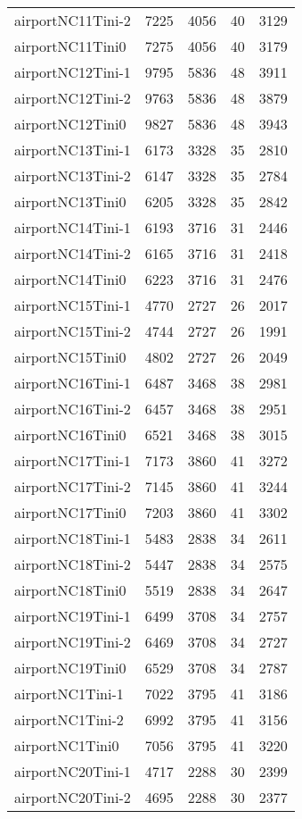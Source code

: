 \begin{longtable}{lrrrr}
airportNC11Tini-2 & 7225 & 4056 & 40 & 3129 \\
airportNC11Tini0 & 7275 & 4056 & 40 & 3179 \\
airportNC12Tini-1 & 9795 & 5836 & 48 & 3911 \\
airportNC12Tini-2 & 9763 & 5836 & 48 & 3879 \\
airportNC12Tini0 & 9827 & 5836 & 48 & 3943 \\
airportNC13Tini-1 & 6173 & 3328 & 35 & 2810 \\
airportNC13Tini-2 & 6147 & 3328 & 35 & 2784 \\
airportNC13Tini0 & 6205 & 3328 & 35 & 2842 \\
airportNC14Tini-1 & 6193 & 3716 & 31 & 2446 \\
airportNC14Tini-2 & 6165 & 3716 & 31 & 2418 \\
airportNC14Tini0 & 6223 & 3716 & 31 & 2476 \\
airportNC15Tini-1 & 4770 & 2727 & 26 & 2017 \\
airportNC15Tini-2 & 4744 & 2727 & 26 & 1991 \\
airportNC15Tini0 & 4802 & 2727 & 26 & 2049 \\
airportNC16Tini-1 & 6487 & 3468 & 38 & 2981 \\
airportNC16Tini-2 & 6457 & 3468 & 38 & 2951 \\
airportNC16Tini0 & 6521 & 3468 & 38 & 3015 \\
airportNC17Tini-1 & 7173 & 3860 & 41 & 3272 \\
airportNC17Tini-2 & 7145 & 3860 & 41 & 3244 \\
airportNC17Tini0 & 7203 & 3860 & 41 & 3302 \\
airportNC18Tini-1 & 5483 & 2838 & 34 & 2611 \\
airportNC18Tini-2 & 5447 & 2838 & 34 & 2575 \\
airportNC18Tini0 & 5519 & 2838 & 34 & 2647 \\
airportNC19Tini-1 & 6499 & 3708 & 34 & 2757 \\
airportNC19Tini-2 & 6469 & 3708 & 34 & 2727 \\
airportNC19Tini0 & 6529 & 3708 & 34 & 2787 \\
airportNC1Tini-1 & 7022 & 3795 & 41 & 3186 \\
airportNC1Tini-2 & 6992 & 3795 & 41 & 3156 \\
airportNC1Tini0 & 7056 & 3795 & 41 & 3220 \\
airportNC20Tini-1 & 4717 & 2288 & 30 & 2399 \\
airportNC20Tini-2 & 4695 & 2288 & 30 & 2377 \\

\end{longtable}
